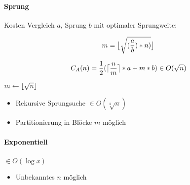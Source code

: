 \paragraph{Sprung}
Kosten Vergleich $a$, Sprung $b$ mit optimaler Sprungweite:

$$m = \floor[\big]{\sqrt{(\frac{a}{b}) * n)}}$$

$$C_A(n) = \frac{1}{2} ( \ceil[\big]{\frac{n}{m}} * a + m*b) \in O(\sqrt{n})$$

\begin{algorithm}[H]


  $m \leftarrow \floor{\sqrt{n}}$


\end{algorithm}

\begin{itemize}
  \item Rekursive Sprungsuche $\in O(\sqrt[k]{n})$
  \item Partitionierung in Blöcke $m$ möglich
\end{itemize}

\paragraph{Exponentiell}
$\in O(\log x)$\

\begin{algorithm}[H]



\end{algorithm}

\begin{itemize}
  \item Unbekanntes $n$ möglich
\end{itemize}

